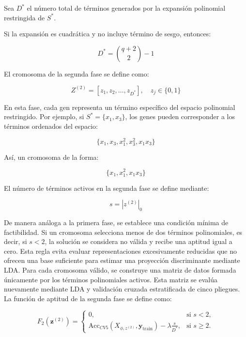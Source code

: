 Sea $D^*$ el número total de términos generados por la expansión polinomial restringida de $S^*$.

Si la expansión es cuadrática y no incluye término de sesgo, entonces:


\begin{equation}
	D^* = \binom{q+2}{2}-1
	\label{eq:EM7}
\end{equation}

El cromosoma de la segunda fase se define como:

\begin{equation}
	Z^{(2)} = [z_1,z_2,\dots,z_{D^*}],\quad z_j \in \{0,1\}
	\label{eq:EM8}
\end{equation}

En esta fase, cada gen representa un término específico del espacio polinomial restringido. Por ejemplo, si $S^*= \{x_1,x_3\}$, los genes pueden corresponder a los términos ordenados del espacio:

\begin{equation}
	\{x_1,x_3,x_1^2,x_3^2,x_1x_3\}
	\label{eq:EM9}
\end{equation}

Así, un cromosoma de la forma:

\begin{equation}
	\{x_1,x_1^2,x_1x_3\}
	\label{eq:EM10}
\end{equation}

El número de términos activos en la segunda fase se define mediante:

\begin{equation}
	s = |z^{(2)}|_0
	\label{eq:EM11}
\end{equation}

De manera análoga a la primera fase, se establece una condición mínima de factibilidad. Si un cromosoma selecciona menos de dos términos polinomiales, es decir, si $s<2$, la solución se considera no válida y recibe una aptitud igual a cero. Esta regla evita evaluar representaciones excesivamente reducidas que no ofrecen una base suficiente para estimar una proyección discriminante mediante LDA.
Para cada cromosoma válido, se construye una matriz de datos formada únicamente por los términos polinomiales activos. Esta matriz se evalúa nuevamente mediante LDA y validación cruzada estratificada de cinco pliegues. La función de aptitud de la segunda fase se define como:

\begin{equation}
	F_2(\mathbf{z}^{(2)}) = 
	\begin{cases} 
		0, & \text{si } s < 2, \\
		\text{Acc}_{CV5}(X_{\phi,z^{(2)}}, \mathbf{y}_{\text{train}}) - \lambda \frac{s}{D^*}, & \text{si } s \geq 2.
	\end{cases}
	\label{eq:EM12}
\end{equation}


